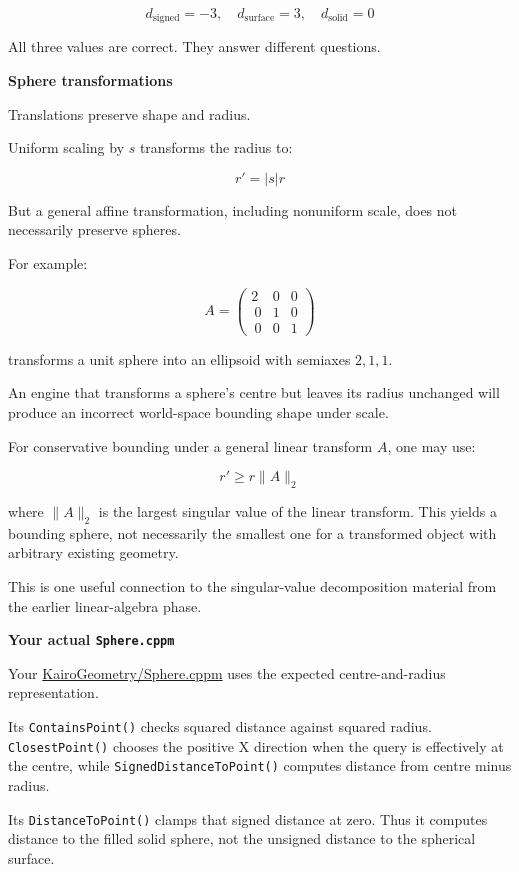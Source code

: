 \[
d_{\mathrm{signed}}=-3,\quad d_{\mathrm{surface}}=3,\quad d_{\mathrm{solid}}=0
\]

All three values are correct. They answer different questions.

\textbf{Sphere transformations}

Translations preserve shape and radius.

Uniform scaling by \(s\) transforms the radius to:

\[
r'=|s|r
\]

But a general affine transformation, including nonuniform scale, does not necessarily preserve spheres.

For example:

\[
A= \begin{pmatrix} 2&0&0\\\ 0&1&0\\\ 0&0&1 \end{pmatrix}
\]

transforms a unit sphere into an ellipsoid with semiaxes \(2,1,1\).

An engine that transforms a sphere's centre but leaves its radius unchanged will produce an incorrect world-space bounding shape under scale.

For conservative bounding under a general linear transform \(A\), one may use:

\[
r'\ge r\|A\|_2
\]

where \(\|A\|_2\) is the largest singular value of the linear transform. This yields a bounding sphere, not necessarily the smallest one for a transformed object with arbitrary existing geometry.

This is one useful connection to the singular-value decomposition material from the earlier linear-algebra phase.

\textbf{Your actual \texttt{Sphere.cppm}}

Your \href{https://github.com/swayam8624/KairoGeometry/blob/master/Sphere.cppm?utm_source=chatgpt.com}{KairoGeometry/Sphere.cppm} uses the expected centre-and-radius representation.

Its \texttt{ContainsPoint()} checks squared distance against squared radius. \texttt{ClosestPoint()} chooses the positive X direction when the query is effectively at the centre, while \texttt{SignedDistanceToPoint()} computes distance from centre minus radius.

Its \texttt{DistanceToPoint()} clamps that signed distance at zero. Thus it computes distance to the filled solid sphere, not the unsigned distance to the spherical surface.

